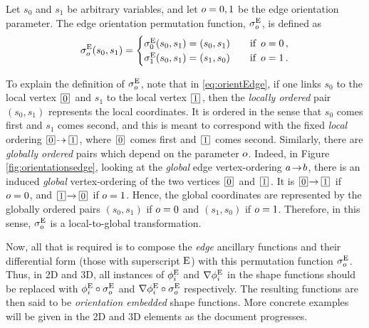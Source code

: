 \begin{definition*}
Let $s_0$ and $s_1$ be arbitrary variables, and let $o=0,1$ be the edge orientation parameter. 
The edge orientation permutation function, $\sigma_o^{\mathrm{E}}$, is defined as
\begin{equation}
	\sigma_o^{\mathrm{E}}(s_0,s_1)=\begin{cases}\sigma_0^{\mathrm{E}}(s_0,s_1)=(s_0,s_1)&\quad\text{if  }\,o=0\,,\\
		\sigma_1^{\mathrm{E}}(s_0,s_1)=(s_1,s_0)&\quad\text{if  }\,o=1\,.\end{cases}\label{eq:orientEdge}
\end{equation}
\end{definition*}

To explain the definition of $\sigma_o^{\mathrm{E}}$, note that in \eqref{eq:orientEdge}, if one links $s_0$ to the local vertex $\boxednum{0}$ and $s_1$ to the local vertex $\boxednum{1}$, then the \textit{locally ordered} pair $(s_0,s_1)$ represents the local coordinates.
It is ordered in the sense that $s_0$ comes first and $s_1$ comes second, and this is meant to correspond with the fixed \textit{local} ordering $\boxednum{0}\!\tdashto\boxednum{1}$, where $\boxednum{0}$ comes first and $\boxednum{1}$ comes second.
Similarly, there are \textit{globally ordered} pairs which depend on the parameter $o$.
Indeed, in Figure \ref{fig:orientationsedge}, looking at the \textit{global} edge vertex-ordering $a\!\to\! b$, there is an induced \textit{global} vertex-ordering of the two vertices $\boxednum{0}$ and $\boxednum{1}$.
It is $\boxednum{0}\!\tto\boxednum{1}$ if $o=0$, and $\boxednum{1}\!\tto\boxednum{0}$ if $o=1$.
Hence, the global coordinates are represented by the globally ordered pairs $(s_0,s_1)$ if $o=0$ and $(s_1,s_0)$ if $o=1$.
Therefore, in this sense, $\sigma_o^{\mathrm{E}}$ is a local-to-global transformation.

Now, all that is required is to compose the \textit{edge} ancillary functions and their differential form (those with superscript $\mathrm{E}$) with this permutation function $\sigma_o^{\mathrm{E}}$.
Thus, in 2D and 3D, all instances of $\phi_i^{\mathrm{E}}$ and $\nabla\phi_i^{\mathrm{E}}$ in the shape functions should be replaced with $\phi_i^{\mathrm{E}}\circ\sigma_o^{\mathrm{E}}$ and $\nabla\phi_i^{\mathrm{E}}\circ\sigma_o^{\mathrm{E}}$ respectively.
The resulting functions are then said to be \textit{orientation embedded} shape functions.
More concrete examples will be given in the 2D and 3D elements as the document progresses.


